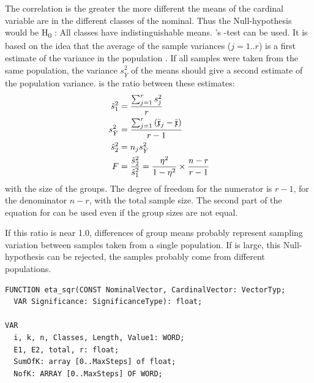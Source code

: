 \begin{refsection}
The correlation is the greater the more different the means of the cardinal variable are in the different classes of the nominal. Thus the Null-hypothesis would be H\textsubscript{0} : All classes have indistinguishable means. 's -test can be used. It is based on the idea that the average of the sample variances  (\( j = 1..r \)) is a first estimate  of the variance in the population . If all samples were taken from the same population, the variance \(s^2_{\bar Y} \) of the  means should give a second estimate  of the population variance.  is the ratio between these estimates:
\begin{align}
  \hat{s}^2_1 &= \frac{\sum_{j=1}^r{s_j^2}}{r} \\
  s^2_{\bar Y} &= \frac{\sum_{j=1}^r{(\bar{\mathfrak{x}}_j - \bar{\mathfrak{x}})}}{r-1} \\
  \hat{s}^2_2 &= n_j s^2_{\bar Y}          \\
  F                &= \frac{\hat{s}_2^2}{\hat{s}_1^2} = \frac{\eta^2}{1-\eta^2} \times \frac{n - r}{r-1}\\
\end{align}
with  the size of the groups. The degree of freedom for the numerator is \(r-1 \), for the denominator \(n-r \), with  the total sample size. The second part of the equation for  can be used even if the group sizes are not equal.

If this ratio is near \num{1.0}, differences of group means probably represent sampling variation between samples taken from a single population. If  is large, this Null-hypothesis can be rejected, the samples probably come from different populations.

\begin{lstlisting}[caption=Nominal/Nominal association]
FUNCTION eta_sqr(CONST NominalVector, CardinalVector: VectorTyp;
  VAR Significance: SignificanceType): float;

VAR
  i, k, n, Classes, Length, Value1: WORD;
  E1, E2, total, r: float;
  SumOfK: array [0..MaxSteps] of float;
  NofK: ARRAY [0..MaxSteps] OF WORD;


\end{lstlisting}
\end{refsection}

